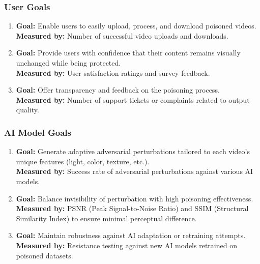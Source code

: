 \subsubsection{User Goals}
\begin{enumerate}
    \item 
    \textbf{Goal:}
    Enable users to easily upload, process, and download poisoned videos. \\
    \textbf{Measured by:} 
    Number of successful video uploads and downloads.
    
    \item 
    \textbf{Goal:}
    Provide users with confidence that their content remains visually unchanged while being protected. \\
    \textbf{Measured by:} 
    User satisfaction ratings and survey feedback.
    
    \item 
    \textbf{Goal:}
    Offer transparency and feedback on the poisoning process. \\
    \textbf{Measured by:} 
    Number of support tickets or complaints related to output quality.
\end{enumerate}

\subsubsection{AI Model Goals}
\begin{enumerate}
    \item 
    \textbf{Goal:}
    Generate adaptive adversarial perturbations tailored to each video's unique features (light, color, texture, etc.). \\
    \textbf{Measured by:} 
    Success rate of adversarial perturbations against various AI models.
    
    \item 
    \textbf{Goal:}
    Balance invisibility of perturbation with high poisoning effectiveness. \\
    \textbf{Measured by:} 
    PSNR (Peak Signal-to-Noise Ratio) and SSIM (Structural Similarity Index) to ensure minimal perceptual difference.
    
    \item 
    \textbf{Goal:}
    Maintain robustness against AI adaptation or retraining attempts. \\
    \textbf{Measured by:} 
    Resistance testing against new AI models retrained on poisoned datasets.
\end{enumerate}



